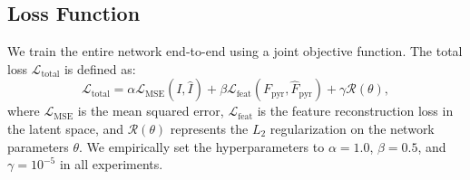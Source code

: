 \subsection{Loss Function}
We train the entire network end-to-end using a joint objective function. The total loss $\mathcal{L}_{\text{total}}$ is defined as:
\begin{equation}
    \mathcal{L}_{\text{total}} = \alpha \mathcal{L}_{\text{MSE}}(I, \hat{I}) + \beta \mathcal{L}_{\text{feat}}(F_{\text{pyr}}, \hat{F}_{\text{pyr}}) + \gamma \mathcal{R}(\theta),
    \label{eq:loss}
\end{equation}
where $\mathcal{L}_{\text{MSE}}$ is the mean squared error, $\mathcal{L}_{\text{feat}}$ is the feature reconstruction loss in the latent space, and $\mathcal{R}(\theta)$ represents the $L_2$ regularization on the network parameters $\theta$. We empirically set the hyperparameters to $\alpha = 1.0$, $\beta = 0.5$, and $\gamma = 10^{-5}$ in all experiments.

